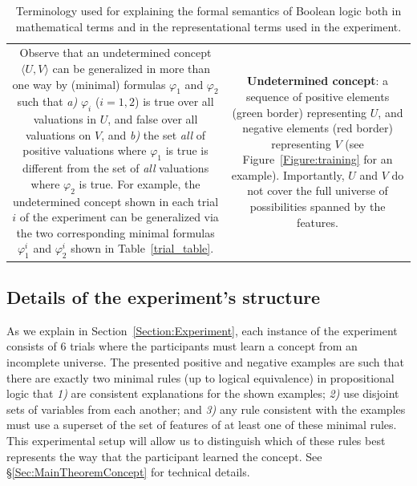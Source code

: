 \begin{table}[]
\begin{tabular}{c|c}
\begin{minipage}[t]{0.45\textwidth}
Observe that an undetermined concept $\langle U,V\rangle$ can be generalized in more than one way by (minimal) formulas $\varphi_1$ and $\varphi_2$ such that {\em a)} $\varphi_i$ ($i=1,2$) is true over all valuations in $U$, and false over all valuations on $V$, and {\em b)} the set {\em all} of positive valuations where $\varphi_1$ is true is different from the set of {\em all} valuations where $\varphi_2$ is true. For example, the undetermined concept shown in each trial $i$ of the experiment can be generalized via the two corresponding minimal formulas $\varphi^i_1$ and $\varphi^i_2$ shown in Table~\ref{trial_table}.


\end{minipage}
&
\begin{minipage}[t]{0.45\textwidth}
{\bf Undetermined concept}: a sequence of positive elements (green border)  representing $U$, and negative elements (red border) representing $V$ (see Figure~\ref{Figure:training} for an example). Importantly, $U$ and $V$ do not cover the full universe of possibilities spanned by the features.
\end{minipage}
\end{tabular}
\caption{Terminology used for explaining the formal semantics of Boolean logic both in mathematical terms and in the representational terms used in the experiment.}
\label{tab:glosario}
\end{table}




\subsection{Details of the experiment's structure} \label{FullExperimentDescription} 
As we explain in Section~\ref{Section:Experiment}, each instance of the experiment consists of 6 trials where the participants must learn a concept from an incomplete universe. The presented positive and negative examples are such that there are exactly two minimal rules (up to logical equivalence) in propositional logic that {\em 1)} are consistent explanations for the shown examples; {\em 2)} use disjoint sets of variables from each another; and {\em 3)} any rule consistent with the examples must use a superset of the set of features of at least one of these minimal rules. 
This experimental setup will allow us to distinguish which of these rules best represents the way that the participant learned the concept. See \S\ref{Sec:MainTheoremConcept} for technical details.



